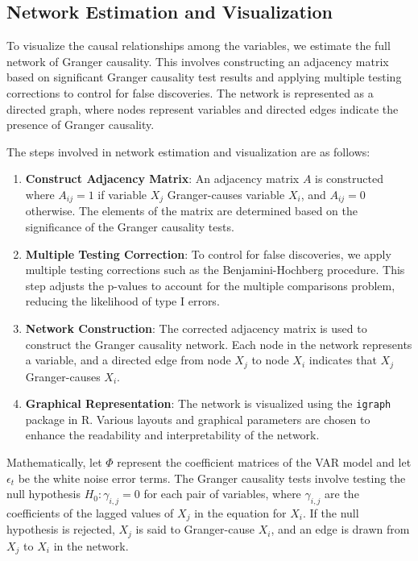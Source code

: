 \documentclass[12pt]{article}
\begin{document}
\subsection{Network Estimation and Visualization}
To visualize the causal relationships among the variables, we estimate the full network of Granger causality. This involves constructing an adjacency matrix based on significant Granger causality test results and applying multiple testing corrections to control for false discoveries. The network is represented as a directed graph, where nodes represent variables and directed edges indicate the presence of Granger causality.

The steps involved in network estimation and visualization are as follows:

\begin{enumerate}
    \item \textbf{Construct Adjacency Matrix}: An adjacency matrix \(A\) is constructed where \(A_{ij} = 1\) if variable \(X_j\) Granger-causes variable \(X_i\), and \(A_{ij} = 0\) otherwise. The elements of the matrix are determined based on the significance of the Granger causality tests.
    \item \textbf{Multiple Testing Correction}: To control for false discoveries, we apply multiple testing corrections such as the Benjamini-Hochberg procedure. This step adjusts the p-values to account for the multiple comparisons problem, reducing the likelihood of type I errors.
    \item \textbf{Network Construction}: The corrected adjacency matrix is used to construct the Granger causality network. Each node in the network represents a variable, and a directed edge from node \(X_j\) to node \(X_i\) indicates that \(X_j\) Granger-causes \(X_i\).
    \item \textbf{Graphical Representation}: The network is visualized using the \texttt{igraph} package in R. Various layouts and graphical parameters are chosen to enhance the readability and interpretability of the network.
\end{enumerate}

Mathematically, let \(\Phi\) represent the coefficient matrices of the VAR model and let \(\epsilon_t\) be the white noise error terms. The Granger causality tests involve testing the null hypothesis \(H_0: \gamma_{i,j} = 0\) for each pair of variables, where \(\gamma_{i,j}\) are the coefficients of the lagged values of \(X_j\) in the equation for \(X_i\). If the null hypothesis is rejected, \(X_j\) is said to Granger-cause \(X_i\), and an edge is drawn from \(X_j\) to \(X_i\) in the network.
\end{document}
